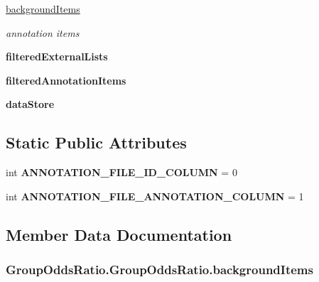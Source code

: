 \begin{DoxyCompactItemize}
\item 
\hyperlink{classGroupOddsRatio_1_1GroupOddsRatio_a4655bff46e55b7dd0d726415726b4dd8}{background\-Items}
\begin{DoxyCompactList}\small\item\em annotation items \end{DoxyCompactList}\item 
\hypertarget{classGroupOddsRatio_1_1GroupOddsRatio_a7b8a8806bcbc063b7962eb8613241d0f}{{\bfseries filtered\-External\-Lists}}\label{classGroupOddsRatio_1_1GroupOddsRatio_a7b8a8806bcbc063b7962eb8613241d0f}

\item 
\hypertarget{classGroupOddsRatio_1_1GroupOddsRatio_ac3fb5ddcbcd90c2c370b27e078f83459}{{\bfseries filtered\-Annotation\-Items}}\label{classGroupOddsRatio_1_1GroupOddsRatio_ac3fb5ddcbcd90c2c370b27e078f83459}

\item 
\hypertarget{classGroupOddsRatio_1_1GroupOddsRatio_a6ac34a0d256191a5c7af5a776bff359b}{{\bfseries data\-Store}}\label{classGroupOddsRatio_1_1GroupOddsRatio_a6ac34a0d256191a5c7af5a776bff359b}

\end{DoxyCompactItemize}
\subsection*{Static Public Attributes}
\begin{DoxyCompactItemize}
\item 
\hypertarget{classGroupOddsRatio_1_1GroupOddsRatio_adcb99c1a1280e2b72f4708ee029bd335}{int {\bfseries A\-N\-N\-O\-T\-A\-T\-I\-O\-N\-\_\-\-F\-I\-L\-E\-\_\-\-I\-D\-\_\-\-C\-O\-L\-U\-M\-N} = 0}\label{classGroupOddsRatio_1_1GroupOddsRatio_adcb99c1a1280e2b72f4708ee029bd335}

\item 
\hypertarget{classGroupOddsRatio_1_1GroupOddsRatio_a7b01b7fd263130f7f43297fc7d4f8615}{int {\bfseries A\-N\-N\-O\-T\-A\-T\-I\-O\-N\-\_\-\-F\-I\-L\-E\-\_\-\-A\-N\-N\-O\-T\-A\-T\-I\-O\-N\-\_\-\-C\-O\-L\-U\-M\-N} = 1}\label{classGroupOddsRatio_1_1GroupOddsRatio_a7b01b7fd263130f7f43297fc7d4f8615}

\end{DoxyCompactItemize}


\subsection{Member Data Documentation}
\hypertarget{classGroupOddsRatio_1_1GroupOddsRatio_a4655bff46e55b7dd0d726415726b4dd8}{
\subsubsection[{background\-Items}]{\setlength{\rightskip}{0pt plus 5cm}Group\-Odds\-Ratio.\-Group\-Odds\-Ratio.\-background\-Items}}\label{classGroupOddsRatio_1_1GroupOddsRatio_a4655bff46e55b7dd0d726415726b4dd8}


